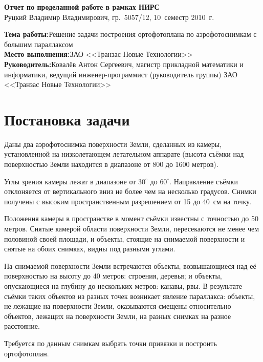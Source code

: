 \documentclass[a4paper,10pt]{article}
\begin{document}

\begin{center}
\begin{spacing}{1.3}
  {\Large\bfseries Отчет по проделанной работе в рамках НИРС} \\
  {\large Руцкий Владимир Владимирович, гр.~5057/12, 10~семестр 2010~г.}
\end{spacing}
\end{center}

\noindent\textbf{Тема работы:}\quad Решение задачи построения ортофотоплана по аэрофотоснимкам с большим параллаксом \\
\textbf{Место выполнения:}\quad ЗАО <<Транзас Новые Технологии>> \\
\textbf{Руководитель:}\quad Ковалёв Антон Сергеевич, 
магистр прикладной математики и информатики, 
ведущий инженер-программист (руководитель группы) ЗАО <<Транзас Новые Технологии>>

\section{Постановка задачи}
Даны два аэрофотоснимка поверхности Земли, сделанных из камеры, установленной на низколетающем летательном аппарате
(высота съёмки над поверхностью Земли находится в диапазоне от 800 до 1600 метров).

Углы зрения камеры лежат в диапазоне от $30^{\circ}$ до $60^{\circ}$.
Направление съёмки отклоняется от вертикального вниз не более чем на несколько градусов.
Снимки получены с высоким пространственным разрешением от 15 до 40~см на точку.

Положения камеры в пространстве в момент съёмки известны с точностью до 50 метров. 
Снятые камерой области поверхности Земли, пересекаются не менее чем половиной своей площади,
и объекты, стоящие на снимаемой поверхности и снятые на обоих снимках, видны под разными углами.

На снимаемой поверхности Земли встречаются объекты, возвышающиеся над её поверхностью на высоту до 40 метров: 
строения, деревья; 
и объекты, опускающиеся на глубину до нескольких метров: канавы, рвы.
В результате съёмки таких объектов из разных точек возникает явление параллакса:
объекты, не лежащие на поверхности Земли, оказываются смещены относительно объектов, лежащих на поверхности Земли,
на разных снимках на разное расстояние.

Требуется по данным снимкам выбрать точки привязки и построить ортофотоплан.
\end{document}
